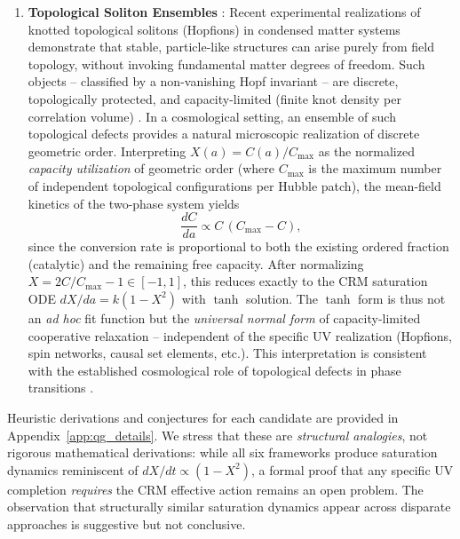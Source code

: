 \documentclass[aps,prd,twocolumn,superscriptaddress,nofootinbib]{revtex4-2}
\begin{document}
\begin{enumerate}
\item \textbf{Topological Soliton Ensembles} \cite{FaddeevNiemi1997,AckermanSmalyukh2017}: Recent experimental realizations of knotted topological solitons (Hopfions) in condensed matter systems \cite{AckermanSmalyukh2017} demonstrate that stable, particle-like structures can arise purely from field topology, without invoking fundamental matter degrees of freedom. Such objects -- classified by a non-vanishing Hopf invariant -- are discrete, topologically protected, and capacity-limited (finite knot density per correlation volume) \cite{BattyeSutcliffe1998}. In a cosmological setting, an ensemble of such topological defects provides a natural microscopic realization of discrete geometric order. Interpreting $X(a) = C(a)/C_{\max}$ as the normalized \textit{capacity utilization} of geometric order (where $C_{\max}$ is the maximum number of independent topological configurations per Hubble patch), the mean-field kinetics of the two-phase system yields
\begin{equation}
\frac{dC}{da} \propto C\,(C_{\max} - C),
\end{equation}
since the conversion rate is proportional to both the existing ordered fraction (catalytic) and the remaining free capacity. After normalizing $X = 2C/C_{\max} - 1 \in [-1,1]$, this reduces exactly to the CRM saturation ODE $dX/da = k(1 - X^2)$ with $\tanh$ solution. The $\tanh$ form is thus not an \textit{ad hoc} fit function but the \textit{universal normal form} of capacity-limited cooperative relaxation -- independent of the specific UV realization (Hopfions, spin networks, causal set elements, etc.). This interpretation is consistent with the established cosmological role of topological defects in phase transitions \cite{VilenkinShellard1994}.
\end{enumerate}

Heuristic derivations and conjectures for each candidate are provided in Appendix~\ref{app:qg_details}. We stress that these are \textit{structural analogies}, not rigorous mathematical derivations: while all six frameworks produce saturation dynamics reminiscent of $dX/dt \propto (1 - X^2)$, a formal proof that any specific UV completion \textit{requires} the CRM effective action remains an open problem. The observation that structurally similar saturation dynamics appear across disparate approaches is suggestive but not conclusive.


\end{document}
